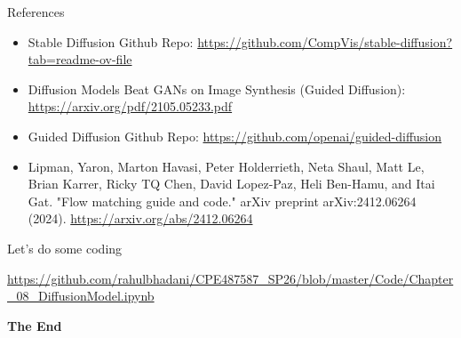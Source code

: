 \documentclass[aspectratio=169,xcolor=dvipsnames,svgnames,x11names,fleqn]{beamer}
\begin{document}
\begin{frame}{References}
    \begin{itemize}
        \item Stable Diffusion Github Repo: \url{https://github.com/CompVis/stable-diffusion?tab=readme-ov-file}
        \item Diffusion Models Beat GANs on Image Synthesis (Guided Diffusion): \url{https://arxiv.org/pdf/2105.05233.pdf}
        \item Guided Diffusion Github Repo: \url{https://github.com/openai/guided-diffusion}
        \item Lipman, Yaron, Marton Havasi, Peter Holderrieth, Neta Shaul, Matt Le, Brian Karrer, Ricky TQ Chen, David Lopez-Paz, Heli Ben-Hamu, and Itai Gat. "Flow matching guide and code." arXiv preprint arXiv:2412.06264 (2024). \url{https://arxiv.org/abs/2412.06264}
    \end{itemize}
\end{frame}

\begin{frame}{Let's do some coding}
    \begin{center}
        \LARGE
        \url{https://github.com/rahulbhadani/CPE487587_SP26/blob/master/Code/Chapter_08_DiffusionModel.ipynb}
    \end{center}
\end{frame}

\begin{frame}
    \Huge{\centerline{\color{MediumBlue}\textbf{The End}}}
\end{frame}
    
\end{document}
